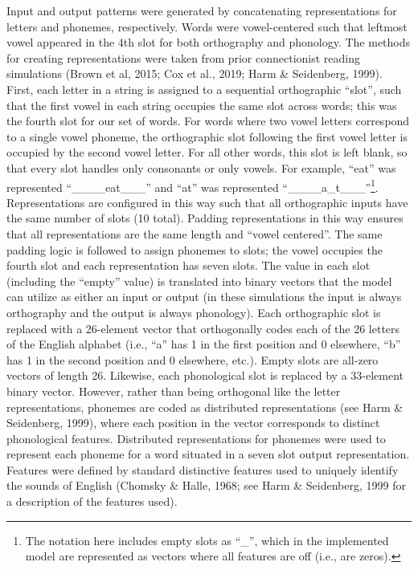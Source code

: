 \documentclass[
  ,man,floatsintext]{apa6}
\begin{document}
Input and output patterns were generated by concatenating representations for letters and phonemes, respectively. Words were vowel-centered such that leftmost vowel appeared in the 4th slot for both orthography and phonology. The methods for creating representations were taken from prior connectionist reading simulations (Brown et al, 2015; Cox et al., 2019; Harm \& Seidenberg, 1999). First, each letter in a string is assigned to a sequential orthographic ``slot'', such that the first vowel in each string occupies the same slot across words; this was the fourth slot for our set of words. For words where two vowel letters correspond to a single vowel phoneme, the orthographic slot following the first vowel letter is occupied by the second vowel letter. For all other words, this slot is left blank, so that every slot handles only consonants or only vowels. For example, ``eat'' was represented ``\_\_\_\_eat\_\_\_'' and ``at'' was represented ``\_\_\_\_a\_t\_\_\_''\footnote{The notation here includes empty slots as ``\_'', which in the implemented model are represented as vectors where all features are off (i.e., are zeros).}. Representations are configured in this way such that all orthographic inputs have the same number of slots (10 total). Padding representations in this way ensures that all representations are the same length and ``vowel centered''. The same padding logic is followed to assign phonemes to slots; the vowel occupies the fourth slot and each representation has seven slots. The value in each slot (including the ``empty'' value) is translated into binary vectors that the model can utilize as either an input or output (in these simulations the input is always orthography and the output is always phonology). Each orthographic slot is replaced with a 26-element vector that orthogonally codes each of the 26 letters of the English alphabet (i.e., ``a'' has 1 in the first position and 0 elsewhere, ``b'' has 1 in the second position and 0 elsewhere, etc.). Empty slots are all-zero vectors of length 26. Likewise, each phonological slot is replaced by a 33-element binary vector. However, rather than being orthogonal like the letter representations, phonemes are coded as distributed representations (see Harm \& Seidenberg, 1999), where each position in the vector corresponds to distinct phonological features. Distributed representations for phonemes were used to represent each phoneme for a word situated in a seven slot output representation. Features were defined by standard distinctive features used to uniquely identify the sounds of English (Chomsky \& Halle, 1968; see Harm \& Seidenberg, 1999 for a description of the features used).
\end{document}

